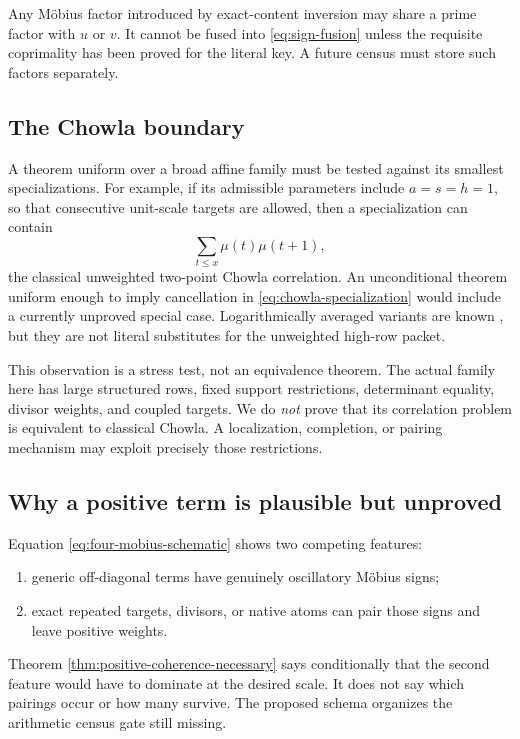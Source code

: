 \begin{remark}
Any M\"obius factor introduced by exact-content inversion may share a
prime factor with \(u\) or \(v\).  It cannot be fused into
\eqref{eq:sign-fusion} unless the requisite coprimality has been
proved for the literal key.  A future census must store such factors
separately.
\end{remark}

\subsection{The Chowla boundary}

A theorem uniform over a broad affine family must be tested against
its smallest specializations.  For example, if its admissible
parameters include \(a=s=h=1\), so that consecutive unit-scale
targets are allowed, then a specialization can contain
\begin{equation}
 \sum_{t\le x}\mu(t)\mu(t+1),
\label{eq:chowla-specialization}
\end{equation}
the classical unweighted two-point Chowla correlation.  An
unconditional theorem uniform enough to imply cancellation in
\eqref{eq:chowla-specialization} would include a currently unproved
special case.  Logarithmically averaged variants are known
\citep{Tao2016}, but they are not literal substitutes for the
unweighted high-row packet.

This observation is a stress test, not an equivalence theorem.  The
actual family here has large structured rows, fixed support
restrictions, determinant equality, divisor weights, and coupled
targets.  We do \emph{not} prove that its correlation problem is
equivalent to classical Chowla.  A localization, completion, or
pairing mechanism may exploit precisely those restrictions.

\subsection{Why a positive term is plausible but unproved}

Equation \eqref{eq:four-mobius-schematic} shows two competing
features:
\begin{enumerate}[leftmargin=2.1em]
 \item generic off-diagonal terms have genuinely oscillatory
 M\"obius signs;
 \item exact repeated targets, divisors, or native atoms can pair
 those signs and leave positive weights.
\end{enumerate}
Theorem \ref{thm:positive-coherence-necessary} says conditionally
that the second feature would have to dominate at the desired scale.
It does not say which pairings occur or how many survive.  The
proposed schema organizes the arithmetic census gate still missing.

